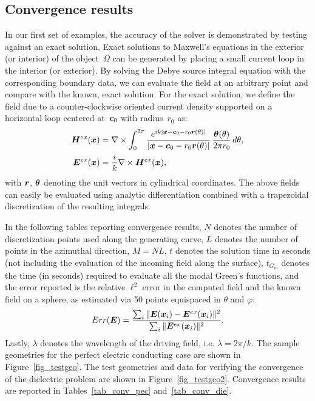 \documentclass[11pt]{article}
\renewcommand{\phi}{\varphi}
\newcommand{\vct}{\vectorsym}
\newcommand{\bx}{\vct{ x}}
\newcommand{\bE}{\vectorsym{E}}
\newcommand{\bH}{\vct{ H}}
\newcommand\btheta{\vct{ \theta}}
\newcommand\rhat{\vct{{r}}}
\numberwithin{equation}{section}
\begin{document}
\subsection{Convergence results}


In our first set of examples, the accuracy of the solver is
demonstrated by testing against an exact
solution. Exact solutions to Maxwell's equations 
in the exterior (or interior) of the object~$\Omega$ can be generated by
placing a small current loop in the interior (or exterior). 
By solving the Debye source integral equation with the corresponding boundary data, 
we can evaluate the field at an arbitrary point and compare with the known, exact
solution. For the exact solution, we define the
field due to a counter-clockwise oriented
current density supported on a horizontal loop centered
at~$\vct{c}_0$ with radius~$r_0$ as:
\begin{equation}
  \begin{aligned}
  \bH^{ex}(\bx) &= \nabla \times  \int_0^{2\pi} 
  \frac{e^{ik|\bx - \vct{c}_0 - r_0 \rhat(\theta)|}}
{|\bx - \vct{c}_0 - r_0 \rhat(\theta)|} \, 
\frac{\btheta(\theta)}{2\pi r_0} \, d\theta, \\
  \bE^{ex}(\bx) &= \frac{i}{k} \nabla \times \bH^{ex}(\bx),
\end{aligned}
\end{equation}
with $\rhat$, $\btheta$ denoting the unit vectors in 
cylindrical coordinates.
The above fields can easily be evaluated using analytic
differentiation combined with  a trapezoidal
discretization of the resulting integrals.

In the following
tables reporting convergence results, $N$ denotes the number of
discretization points used along the generating curve, $L$ denotes the
number of points in the azimuthal direction, $M = NL$, $t$ denotes the solution
time in seconds (not including the evaluation of the incoming field along
the surface),
$t_{G_m}$ denotes the time (in seconds) required to evaluate all the
modal Green's functions,
and
the error reported is the relative $\ell^2$ error in the computed field and the
known field on a sphere, as
estimated via 50 points equispaced in $\theta$ and $\phi$:
\begin{equation}
  Err(\bE) = \frac{\sum_i \| \bE(\bx_i) - \bE^{ex}(\bx_i)
    \|^2 }
  {\sum_i \|  \bE^{ex}(\bx_i) \|^2 }.
\end{equation}
Lastly, $\lambda$ denotes the
wavelength of the driving field, i.e. $\lambda = 2\pi/k$.
The sample geometries for the perfect electric conducting case
are shown in Figure~\ref{fig_testgeo}. The test geometries and data
for verifying the convergence of the dielectric problem are
shown in Figure~\ref{fig_testgeo2}. 
Convergence results are reported in Tables~\ref{tab_conv_pec}
and~\ref{tab_conv_die}.
\end{document}

